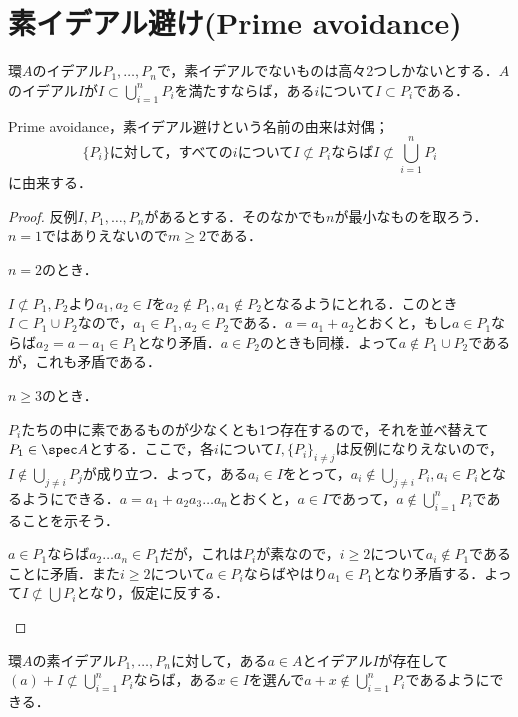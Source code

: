 \section{素イデアル避け(Prime avoidance)}

\begin{lem}\label{lem:Prime avoidance}
	環$A$のイデアル$P_1,\dots, P_n$で，素イデアルでないものは高々2つしかないとする．$A$のイデアル$I$が$I\subset\bigcup_{i=1}^n P_i$を満たすならば，ある$i$について$I\subset P_i$である．
\end{lem}

Prime avoidance，素イデアル避けという名前の由来は対偶；
\[\{P_i\}\text{に対して，すべての}i\text{について}I\not\subset P_i\text{ならば}I\not\subset\bigcup_{i=1}^n P_i\]
に由来する．
\begin{proof}
	反例$I,P_1,\dots, P_n$があるとする．そのなかでも$n$が最小なものを取ろう．$n=1$ではありえないので$m\geq 2$である．
	
	\begin{sakura}
		\item $n=2$のとき．
		
		$I\not\subset P_1,P_2$より$a_1,a_2\in I$を$a_2\not\in P_1,a_1\not\in P_2$となるようにとれる．このとき$I\subset P_1\cup P_2$なので，$a_1\in P_1,a_2\in P_2$である．$a=a_1+a_2$とおくと，もし$a\in P_1$ならば$a_2=a-a_1\in P_1$となり矛盾．$a\in P_2$のときも同様．よって$a\not\in P_1\cup P_2$であるが，これも矛盾である．
		
		\item $n\geq3$のとき．
		
		$P_i$たちの中に素であるものが少なくとも1つ存在するので，それを並べ替えて$P_1\in\spec A$とする．ここで，各$i$について$I,\{P_i\}_{i\neq j}$は反例になりえないので，$I\not\in\bigcup_{j\neq i}P_j$が成り立つ．よって，ある$a_i\in I$をとって，$a_i\not\in\bigcup_{j\neq i}P_i,a_i\in P_i$となるようにできる．$a=a_1+a_2a_3\dots a_n$とおくと，$a\in I$であって，$a\not\in\bigcup_{i=1}^n P_i$であることを示そう．
		
		$a\in P_1$ならば$a_2\dots a_n\in P_1$だが，これは$P_i$が素なので，$i\geq2$について$a_i\not\in P_1$であることに矛盾．また$i\geq2$について$a\in P_i$ならばやはり$a_1\in P_1$となり矛盾する．よって$I\not\subset\bigcup P_i$となり，仮定に反する．
	\end{sakura}
\end{proof}

\begin{thm}[Davisの補題]\label{thm:Davisの補題}
	環$A$の素イデアル$P_1,\dots,P_n$に対して，ある$a\in A$とイデアル$I$が存在して$(a)+I\not\subset\bigcup_{i=1}^n P_i$ならば，ある$x\in I$を選んで$a+x\not\in\bigcup_{i=1}^n P_i$であるようにできる．
\end{thm}

